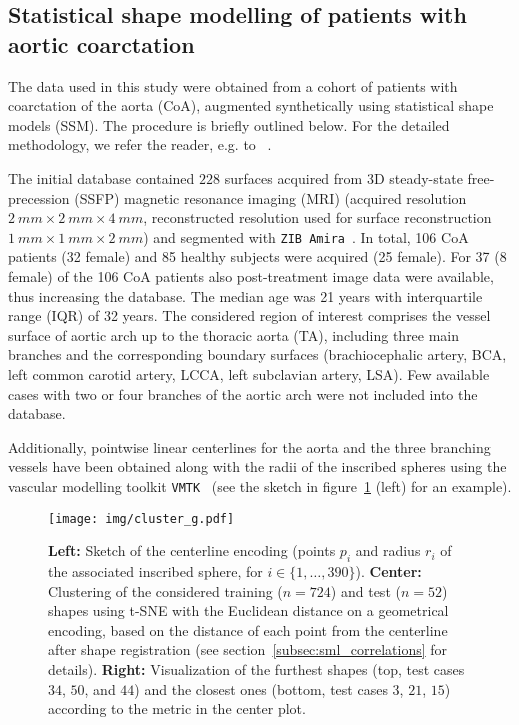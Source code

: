 \subsection{Statistical shape modelling of patients with aortic coarctation}
\label{subsec:ssm}

The data used in this study were obtained from a cohort of patients with coarctation of the aorta (CoA), augmented synthetically using statistical shape models (SSM). The procedure is briefly outlined below. For the detailed methodology, we refer the reader, e.g. to 
~\cite{goubergrits2022ct, thamsen2021synthetic,thamsen2020unsupervised,versnjak2024deep, yevtushenko2021deep}.

The initial database contained $228$ surfaces acquired from 3D steady-state free-precession (SSFP) magnetic resonance imaging (MRI)
(acquired resolution $\SI{2}{mm}\times \SI{2}{mm}\times \SI{4}{mm}$, reconstructed resolution used for surface reconstruction $\SI{1}{mm}\times \SI{1}{mm}\times \SI{2}{mm}$) and segmented with \texttt{ZIB Amira}~\cite{stalling2005amira}. In total, 106 CoA patients (32 female) and 85 healthy subjects were acquired (25 female). 
For 37 (8 female) of the 106 CoA patients also post-treatment image data were available, thus increasing the database. The median age was 21 years with interquartile range (IQR) of 32 years.
The considered region of interest comprises the vessel surface of aortic arch up to the thoracic aorta (TA), including three main branches 
and the corresponding boundary surfaces (brachiocephalic artery, BCA, left common carotid artery, LCCA, left subclavian artery, LSA). Few available cases with two or four branches of the aortic arch were not included into the database.

Additionally, pointwise linear centerlines for the aorta and the three branching vessels have been obtained along with the radii of the inscribed spheres using the vascular modelling toolkit \texttt{VMTK}~\cite{antiga2008image} (see the sketch in figure~\ref{fig:clustergeometries} (left) for an example).
%
\begin{figure}[!htp]
  \centering
  \texttt{[image: img/cluster\_g.pdf]}
  \caption{
  \textbf{Left:} Sketch of the centerline encoding (points $p_i$ and radius $r_i$ of the associated inscribed sphere, for $i\in\{1,\dots,390\}$). 
  \textbf{Center:} Clustering of the considered training ($n=724$) and test ($n=52$) shapes using t-SNE
  with the Euclidean distance on a geometrical encoding, based on the distance of each point from the centerline after shape registration (see section~\ref{subsec:sml_correlations} for details).
  \textbf{Right:} Visualization of the furthest shapes (top, test cases $34$, $50$, and $44$) and the closest ones (bottom, test cases $3$, $21$, $15$) according to the metric in the center plot.}
  \label{fig:clustergeometries}
\end{figure}

